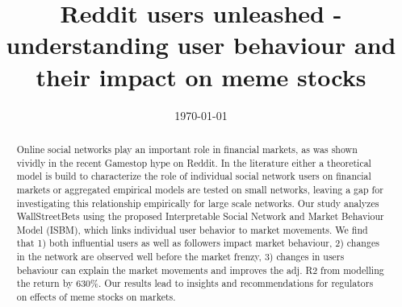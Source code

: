 \documentclass[11pt,a4paper,rorate,times]{article}
\title{	Reddit users unleashed - understanding user behaviour and their impact on meme stocks %
}
\author{ }
\date{\today}
\begin{document}
\maketitle
\vspace{-0.75cm}
\begin{abstract}

	
	Online social networks play an important role in financial markets, as was shown vividly in the recent Gamestop hype on Reddit. In the literature either a theoretical model is build to characterize the role of individual social network users on financial markets or aggregated empirical models are tested on small networks, leaving a gap for investigating this relationship empirically for large scale networks. Our study analyzes WallStreetBets using the proposed Interpretable Social Network and Market Behaviour Model (ISBM), which links individual user behavior to market movements. We find that 1) both influential users as well as followers impact market behaviour, 2) changes in the network are observed well before the market frenzy, 3) changes in users behaviour can explain the market movements and improves the adj. R2 from modelling the return by 630\%. Our results lead to insights and recommendations for regulators on effects of meme stocks on markets.
\end{abstract}
\end{document}

